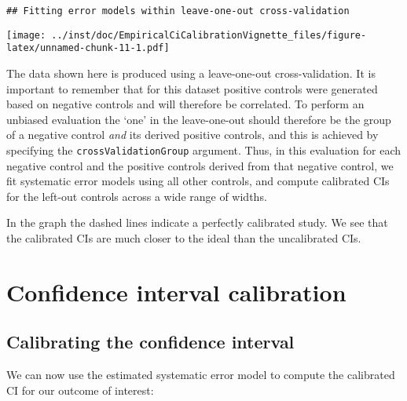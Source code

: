 \documentclass[
]{article}
\newenvironment{Shaded}{\begin{snugshade}}{\end{snugshade}}
\newcommand{\KeywordTok}[1]{\textcolor[rgb]{0.13,0.29,0.53}{\textbf{#1}}}
\newcommand{\NormalTok}[1]{#1}
\newcommand{\OperatorTok}[1]{\textcolor[rgb]{0.81,0.36,0.00}{\textbf{#1}}}
\newcommand{\StringTok}[1]{\textcolor[rgb]{0.31,0.60,0.02}{#1}}
\begin{document}
\begin{verbatim}
## Fitting error models within leave-one-out cross-validation
\end{verbatim}

\texttt{[image: ../inst/doc/EmpiricalCiCalibrationVignette\_files/figure-latex/unnamed-chunk-11-1.pdf]}

The data shown here is produced using a leave-one-out cross-validation.
It is important to remember that for this dataset positive controls were
generated based on negative controls and will therefore be correlated.
To perform an unbiased evaluation the `one' in the leave-one-out should
therefore be the group of a negative control \emph{and} its derived
positive controls, and this is achieved by specifying the
\texttt{crossValidationGroup} argument. Thus, in this evaluation for
each negative control and the positive controls derived from that
negative control, we fit systematic error models using all other
controls, and compute calibrated CIs for the left-out controls across a
wide range of widths.

In the graph the dashed lines indicate a perfectly calibrated study. We
see that the calibrated CIs are much closer to the ideal than the
uncalibrated CIs.

\hypertarget{confidence-interval-calibration}{%
\section{Confidence interval
calibration}\label{confidence-interval-calibration}}

\hypertarget{calibrating-the-confidence-interval}{%
\subsection{Calibrating the confidence
interval}\label{calibrating-the-confidence-interval}}

We can now use the estimated systematic error model to compute the
calibrated CI for our outcome of interest:

\begin{Shaded}
\end{Shaded}
\end{document}
